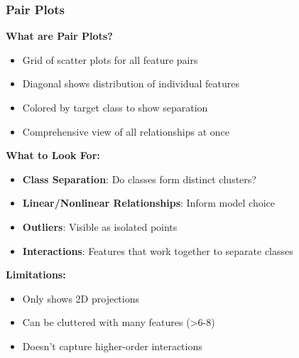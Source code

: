\documentclass[aspectratio=169]{beamer}
\begin{document}
\begin{frame}
\frametitle{Pair Plots}

\textbf{What are Pair Plots?}
\begin{itemize}
    \item Grid of scatter plots for all feature pairs
    \item Diagonal shows distribution of individual features
    \item Colored by target class to show separation
    \item Comprehensive view of all relationships at once
\end{itemize}

\vspace{0.5cm}

\textbf{What to Look For:}
\begin{itemize}
    \item \textbf{Class Separation}: Do classes form distinct clusters?
    \item \textbf{Linear/Nonlinear Relationships}: Inform model choice
    \item \textbf{Outliers}: Visible as isolated points
    \item \textbf{Interactions}: Features that work together to separate classes
\end{itemize}

\vspace{0.3cm}

\textbf{Limitations:}
\begin{itemize}
    \item Only shows 2D projections
    \item Can be cluttered with many features (>6-8)
    \item Doesn't capture higher-order interactions
\end{itemize}

\end{frame}
\end{document}
